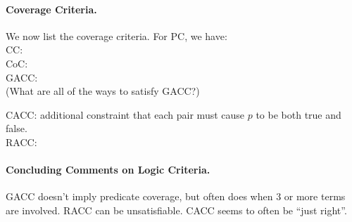 \documentclass[11pt]{article}
\begin{document}

\paragraph{Coverage Criteria.} We now list the coverage criteria. For PC,
we have: \\[1.5em]

CC:\\[1.5em]

CoC:\\[2em]

GACC:\\[5em]

(What are all of the ways to satisfy GACC?)

CACC: additional constraint that each pair must cause $p$ to be
both true and false.\\[3em]

RACC:

\paragraph{Concluding Comments on Logic Criteria.} GACC doesn't imply
predicate coverage, but often does when 3 or more terms are involved.
RACC can be unsatisfiable. CACC seems to often be ``just right''.
\end{document}
